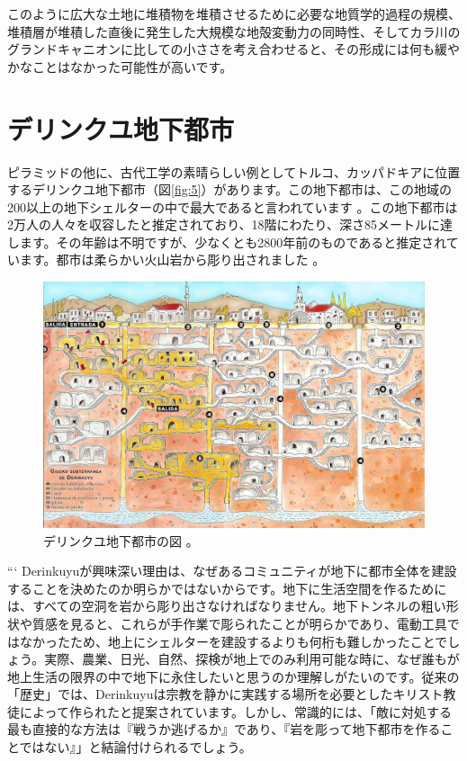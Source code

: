 \documentclass[10pt,twocolumn,letterpaper]{article}
\begin{document}
このように広大な土地に堆積物を堆積させるために必要な地質学的過程の規模、堆積層が堆積した直後に発生した大規模な地殻変動力の同時性、そしてカラ川のグランドキャニオンに比しての小ささを考え合わせると、その形成には何も緩やかなことはなかった可能性が高いです。

\section{デリンクユ地下都市}

ピラミッドの他に、古代工学の素晴らしい例としてトルコ、カッパドキアに位置するデリンクユ地下都市（図\ref{fig:5}）があります。この地下都市は、この地域の200以上の地下シェルターの中で最大であると言われています \cite{54}。この地下都市は2万人の人々を収容したと推定されており、18階にわたり、深さ85メートルに達します。その年齢は不明ですが、少なくとも2800年前のものであると推定されています。都市は柔らかい火山岩から彫り出されました \cite{52, 53}。

\begin{figure}[b]
\begin{center}
   \includegraphics[width=1\linewidth]{derinkuyu.jpeg}
\end{center}
   \caption{デリンクユ地下都市の図 \cite{56}。}
\label{fig:5}
\label{fig:onecol}
\end{figure}
```
Derinkuyuが興味深い理由は、なぜあるコミュニティが地下に都市全体を建設することを決めたのか明らかではないからです。地下に生活空間を作るためには、すべての空洞を岩から彫り出さなければなりません。地下トンネルの粗い形状や質感を見ると、これらが手作業で彫られたことが明らかであり、電動工具ではなかったため、地上にシェルターを建設するよりも何桁も難しかったことでしょう。実際、農業、日光、自然、探検が地上でのみ利用可能な時に、なぜ誰もが地上生活の限界の中で地下に永住したいと思うのか理解しがたいのです。従来の「歴史」では、Derinkuyuは宗教を静かに実践する場所を必要としたキリスト教徒によって作られたと提案されています\cite{53}。しかし、常識的には、「敵に対処する最も直接的な方法は『戦うか逃げるか』であり、『岩を彫って地下都市を作ることではない』」と結論付けられるでしょう。
\end{document}
